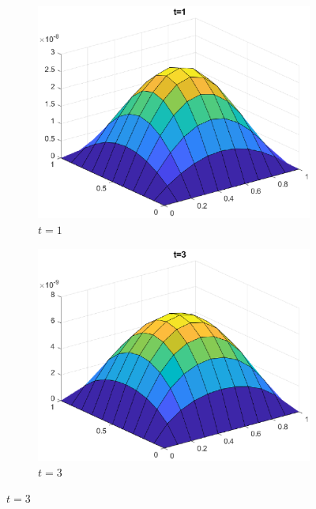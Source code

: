 \documentclass[]{article}
\begin{document}
	\begin{figure}[htbp]
		\centering	
		\begin{subfigure}[b]{0.45\textwidth}
			\includegraphics[width=\textwidth]{images/h4_t1.eps}
			\caption{$t = 1$}
			\label{fig:image4}
		\end{subfigure}
		\hfill
		\begin{subfigure}[b]{0.45\textwidth}
			\includegraphics[width=\textwidth]{images/h4_t2.eps}
			\caption{$t = 3$}
			\label{fig:image5}
		\end{subfigure}
	\end{figure}
\end{document}
